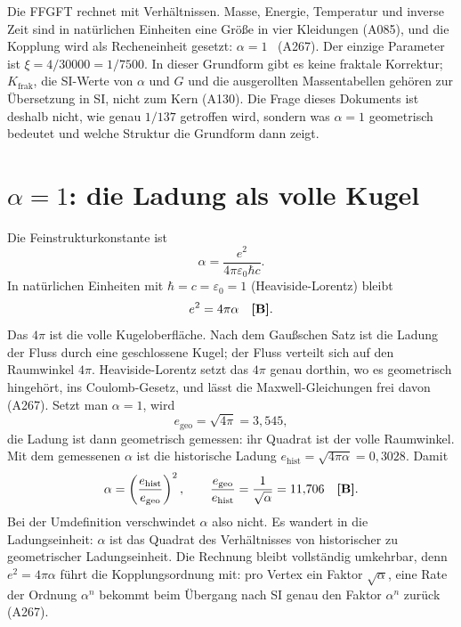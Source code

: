 Die FFGFT rechnet mit Verhältnissen. Masse, Energie, Temperatur und inverse Zeit sind in
natürlichen Einheiten eine Größe in vier Kleidungen (A085), und die Kopplung wird als
Recheneinheit gesetzt: $\alpha=1$ \QM\ (A267). Der einzige Parameter ist $\xi=4/30000=1/7500$.
In dieser Grundform gibt es keine fraktale Korrektur; $K_{\text{frak}}$, die SI-Werte von
$\alpha$ und $G$ und die ausgerollten Massentabellen gehören zur Übersetzung in SI, nicht zum
Kern (A130). Die Frage dieses Dokuments ist deshalb nicht, wie genau $1/137$ getroffen wird,
sondern was $\alpha=1$ geometrisch bedeutet und welche Struktur die Grundform dann zeigt.

\section{\texorpdfstring{$\alpha=1$}{alpha = 1}: die Ladung als volle Kugel}

Die Feinstrukturkonstante ist
\begin{equation}
  \alpha=\frac{e^2}{4\pi\varepsilon_0\hbar c}.
\end{equation}
In natürlichen Einheiten mit $\hbar=c=\varepsilon_0=1$ (Heaviside-Lorentz) bleibt
\begin{equation}
  e^2=4\pi\alpha \quad\textbf{[B]} .
\end{equation}
Das $4\pi$ ist die volle Kugeloberfläche. Nach dem Gaußschen Satz ist die Ladung der Fluss durch
eine geschlossene Kugel; der Fluss verteilt sich auf den Raumwinkel $4\pi$. Heaviside-Lorentz
setzt das $4\pi$ genau dorthin, wo es geometrisch hingehört, ins Coulomb-Gesetz, und lässt die
Maxwell-Gleichungen frei davon (A267). Setzt man $\alpha=1$, wird
\begin{equation}
  e_{\text{geo}}=\sqrt{4\pi}=3{,}545 ,
\end{equation}
die Ladung ist dann geometrisch gemessen: ihr Quadrat ist der volle Raumwinkel. Mit dem
gemessenen $\alpha$ ist die historische Ladung $e_{\text{hist}}=\sqrt{4\pi\alpha}=0{,}3028$. Damit
\begin{equation}
  \alpha=\left(\frac{e_{\text{hist}}}{e_{\text{geo}}}\right)^2,\qquad
  \frac{e_{\text{geo}}}{e_{\text{hist}}}=\frac1{\sqrt\alpha}=11{,}706\quad\textbf{[B]} .
\end{equation}
Bei der Umdefinition verschwindet $\alpha$ also nicht. Es wandert in die Ladungseinheit: $\alpha$
ist das Quadrat des Verhältnisses von historischer zu geometrischer Ladungseinheit. Die Rechnung
bleibt vollständig umkehrbar, denn $e^2=4\pi\alpha$ führt die Kopplungsordnung mit: pro Vertex
ein Faktor $\sqrt\alpha$, eine Rate der Ordnung $\alpha^n$ bekommt beim Übergang nach SI genau den
Faktor $\alpha^n$ zurück (A267).

